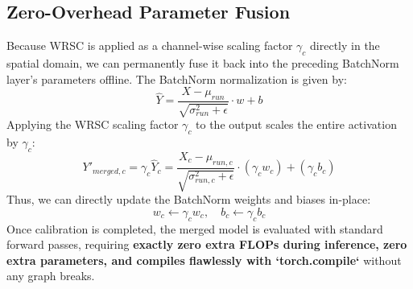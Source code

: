 \documentclass{article}
\theoremstyle{plain}
\theoremstyle{definition}
\theoremstyle{remark}
\begin{document}
\subsection{Zero-Overhead Parameter Fusion}
Because WRSC is applied as a channel-wise scaling factor $\gamma_c$ directly in the spatial domain, we can permanently fuse it back into the preceding BatchNorm layer's parameters offline.
The BatchNorm normalization is given by:
\begin{equation}
\hat{Y} = \frac{X - \mu_{run}}{\sqrt{\sigma_{run}^2 + \epsilon}} \cdot w + b
\end{equation}
Applying the WRSC scaling factor $\gamma_c$ to the output scales the entire activation by $\gamma_c$:
\begin{equation}
Y'_{merged, c} = \gamma_c \hat{Y}_c = \frac{X_c - \mu_{run, c}}{\sqrt{\sigma_{run, c}^2 + \epsilon}} \cdot (\gamma_c w_c) + (\gamma_c b_c)
\end{equation}
Thus, we can directly update the BatchNorm weights and biases in-place:
\begin{equation}
w_c \leftarrow \gamma_c w_c, \quad b_c \leftarrow \gamma_c b_c
\end{equation}
Once calibration is completed, the merged model is evaluated with standard forward passes, requiring \textbf{exactly zero extra FLOPs during inference, zero extra parameters, and compiles flawlessly with `torch.compile`} without any graph breaks.
\end{document}
